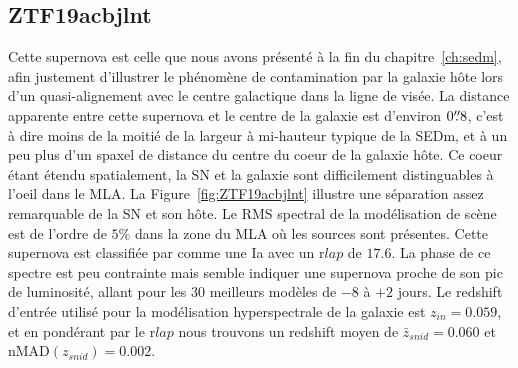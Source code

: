\documentclass[../main/main.tex]{subfiles}
\begin{document}
\subsection{ZTF19acbjlnt}

Cette supernova est celle que nous avons présenté à la fin du
chapitre~\ref{ch:sedm}, afin justement d'illustrer le phénomène de
contamination par la galaxie hôte lors d'un quasi-alignement avec le centre
galactique dans la ligne de visée. La distance apparente entre cette
supernova et le centre de la galaxie est d'environ $0\overset{\prime\prime}{.}8$, c'est à dire moins de la moitié
de la largeur à mi-hauteur typique de la SEDm, et à un peu plus d'un spaxel
de distance du centre du coeur de la galaxie hôte. Ce coeur étant étendu
spatialement, la SN et la galaxie sont difficilement distinguables à
l'oeil dans le MLA. La Figure~\ref{fig:ZTF19acbjlnt} illustre une
séparation assez remarquable de la SN et son hôte. Le RMS spectral de la
modélisation de scène est de l'ordre de $5\%$ dans la zone du MLA où les
sources sont présentes. Cette supernova est classifiée par 
comme une Ia avec un r$lap$ de $17.6$. La phase de ce spectre est peu contrainte mais semble
indiquer une supernova proche de son pic de luminosité, allant pour
les $30$ meilleurs modèles de $-8$ à $+2$ jours.
Le redshift d'entrée utilisé pour la modélisation hyperspectrale de la
galaxie est $z_{in}=0.059$, et en pondérant par le r$lap$ nous trouvons
un redshift moyen de $\bar{z}_{snid}=0.060$ et nMAD$(z_{snid})=0.002$.
\end{document}
